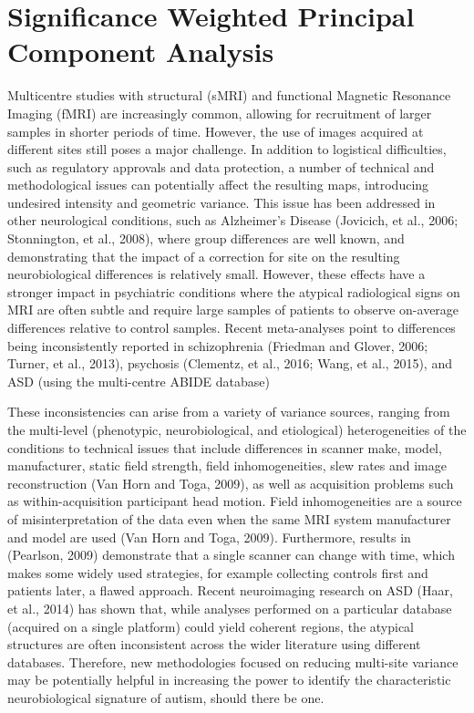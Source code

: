 \chapter{Significance Weighted Principal Component Analysis}\label{ch:swpca}
Multicentre studies with structural (sMRI) and functional Magnetic
Resonance Imaging (fMRI) are increasingly common, allowing for
recruitment of larger samples in shorter periods of time. However, the
use of images acquired at different sites still poses a major
challenge. In addition to logistical difficulties, such as regulatory
approvals and data protection, a number of technical and methodological
issues can potentially affect the resulting maps, introducing undesired
intensity and geometric variance. This issue has been addressed in
other neurological conditions, such as Alzheimer’s Disease (Jovicich,
et al., 2006; Stonnington, et al., 2008), where group differences are
well known, and demonstrating that the impact of a correction for site
on the resulting neurobiological differences is relatively small.
However, these effects have a stronger impact in psychiatric conditions
where the atypical radiological signs on MRI are often subtle and
require large samples of patients to observe on-average differences
relative to control samples. Recent meta-analyses point to differences
being inconsistently reported in schizophrenia (Friedman and Glover,
2006; Turner, et al., 2013), psychosis (Clementz, et al., 2016; Wang,
et al., 2015), and \ac{ASD} (using the multi-centre ABIDE database) \cite{haar2014anatomical}

These inconsistencies can arise from a variety of variance sources,
ranging from the multi-level (phenotypic, neurobiological, and
etiological) heterogeneities of the conditions to technical issues that
include differences in scanner make, model, manufacturer, static field
strength, field inhomogeneities, slew rates and image reconstruction
(Van Horn and Toga, 2009), as well as acquisition problems such as
within-acquisition participant head motion. Field inhomogeneities are a
source of misinterpretation of the data even when the same MRI system
manufacturer and model are used (Van Horn and Toga, 2009). Furthermore,
results in (Pearlson, 2009) demonstrate that a single scanner can
change with time, which makes some widely used strategies, for example
collecting controls first and patients later, a flawed approach. Recent
neuroimaging research on ASD (Haar, et al., 2014) has shown that, while
analyses performed on a particular database (acquired on a single
platform) could yield coherent regions, the atypical structures are
often inconsistent across the wider literature using different
databases. Therefore, new methodologies focused on reducing multi-site
variance may be potentially helpful in increasing the power to identify
the characteristic neurobiological signature of autism, should there be
one. 


